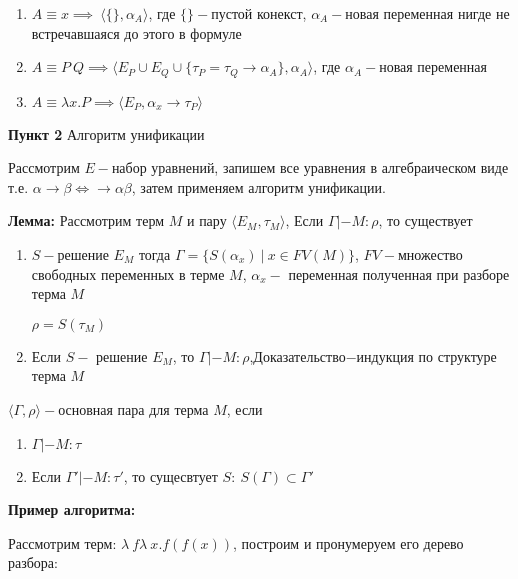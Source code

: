 \documentclass[12pt, a4paper]{article}
\begin{document}
			\begin{enumerate}
				\item $A\equiv x\implies\:\big \langle \{\}, \alpha_A\big\rangle$, где $\{\}-$пустой конекст, $\alpha_A-$новая переменная нигде не встречавшаяся до этого в формуле
				\item $A\equiv P\:Q\implies\big \langle E_P\cup E_Q\cup \{\tau_P=\tau_Q\rightarrow\alpha_A\}, \alpha_A\big \rangle$, где $\alpha_A-$новая переменная
				\item $A\equiv\lambda x.P\implies\big\langle E_P,\alpha_x\rightarrow\tau_P\big\rangle$
			\end{enumerate}
		\textbf{Пункт 2} Алгоритм унификации\par
			Рассмотрим $E-$набор уравнений, запишем все уравнения в алгебраическом виде т.е. $\alpha\rightarrow\beta\Leftrightarrow\rightarrow\alpha\beta$, затем применяем алгоритм унификации.\par
	\textbf{Лемма:} Рассмотрим терм $M$ и пару $\big\langle E_M, \tau_M\big\rangle$, Если $\Gamma|-M:\rho$, то существует 
	\begin{enumerate}
		\item $S-$решение $E_M$ тогда $\Gamma=\{S(\alpha_x)\:|\:x\in FV(M)\}$, $FV-$множество свободных переменных в терме $M$, $\alpha_x-$ переменная полученная при разборе терма $M$\par
		$\rho=S(\tau_M)$
		\item Если $S-$ решение $E_M$, то $\Gamma|-M:\rho$,Доказательство$-$индукция по структуре терма $M$
	\end{enumerate}				
		 $\big \langle\Gamma,\rho\big\rangle-$основная пара для терма $M$, если 
		 \begin{enumerate}
			\item $\Gamma|-M:\tau$
			\item Если $\Gamma'|-M:\tau'$, то сущесвтует $S:\:S(\Gamma)\subset\Gamma'$
		 \end{enumerate}
		 \textbf{Пример алгоритма:}\par 
		 	Рассмотрим терм: $\lambda\:f\lambda\:x.f(f(x))$, построим и пронумеруем его дерево разбора:\par
\end{document}
